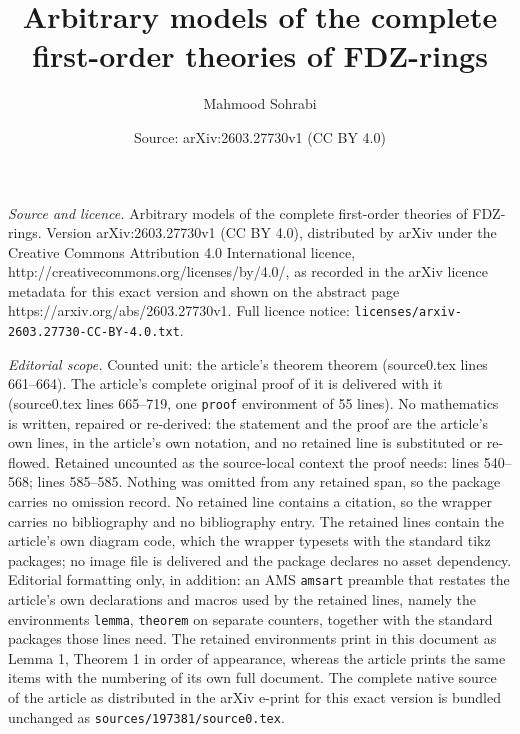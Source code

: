 \documentclass[10pt,a4paper]{amsart}
\title{Arbitrary models of the complete first-order theories of FDZ-rings}
\author{Mahmood Sohrabi}
\date{Source: arXiv:2603.27730v1 (CC BY 4.0)}
\begin{document}
\maketitle

\noindent\emph{Source and licence.} Arbitrary models of the complete first-order theories of FDZ-rings. Version arXiv:2603.27730v1 (CC BY 4.0), distributed by arXiv under the Creative Commons Attribution 4.0 International licence, http://creativecommons.org/licenses/by/4.0/, as recorded in the arXiv licence metadata for this exact version and shown on the abstract page https://arxiv.org/abs/2603.27730v1. Full licence notice: \texttt{licenses/arxiv-2603.27730-CC-BY-4.0.txt}.\par\smallskip

\noindent\textit{Editorial scope.} Counted unit: the article's theorem theorem (source0.tex lines 661--664). The article's complete original proof of it is delivered with it (source0.tex lines 665--719, one \texttt{proof} environment of 55 lines). No mathematics is written, repaired or re-derived: the statement and the proof are the article's own lines, in the article's own notation, and no retained line is substituted or re-flowed.  Retained uncounted as the source-local context the proof needs: lines 540--568; lines 585--585.  Nothing was omitted from any retained span, so the package carries no omission record.  No retained line contains a citation, so the wrapper carries no bibliography and no bibliography entry.  The retained lines contain the article's own diagram code, which the wrapper typesets with the standard tikz packages; no image file is delivered and the package declares no asset dependency.  Editorial formatting only, in addition: an AMS \texttt{amsart} preamble that restates the article's own declarations and macros used by the retained lines, namely the environments \texttt{lemma}, \texttt{theorem} on separate counters, together with the standard packages those lines need.  The retained environments print in this document as Lemma 1, Theorem 1 in order of appearance, whereas the article prints the same items with the numbering of its own full document.  The complete native source of the article as distributed in the arXiv e-print for this exact version is bundled unchanged as \texttt{sources/197381/source0.tex}.
\end{document}
